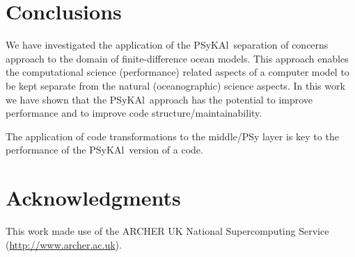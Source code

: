 \documentclass[journal]{IEEEtran}
\newcommand{\psykal}{{PS}y{KA}l\ }
\begin{document}
%
%







\section{Conclusions}

We have investigated the application of the \psykal separation of
concerns approach to the domain of finite-difference ocean
models. This approach enables the computational science (performance)
related aspects of a computer model to be kept separate from the
natural (oceanographic) science aspects. In this work we have shown
that the \psykal approach has the potential to improve performance and
to improve code structure/maintainability.

The application of code transformations to the middle/PSy layer is key
to the performance of the \psykal version of a code.




\section*{Acknowledgments}


This work made use of the ARCHER UK National Supercomputing Service
(\url{http://www.archer.ac.uk}).



%
\end{document}
